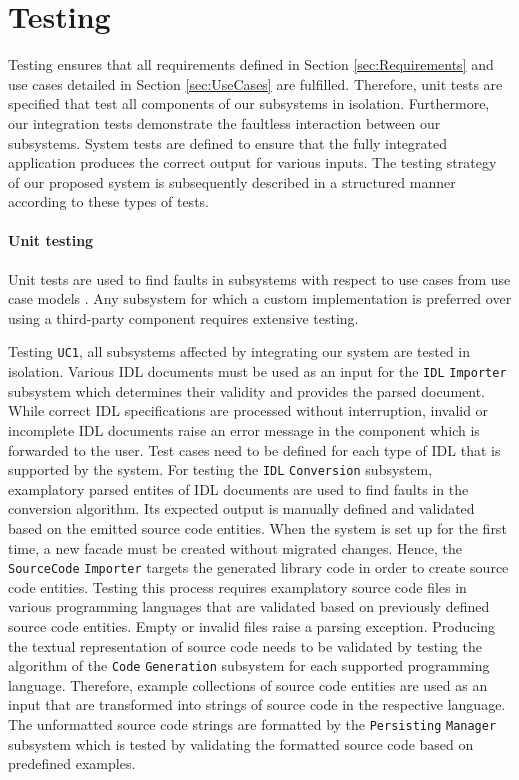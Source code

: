 \section{Testing}
\label{sec:Testing}

Testing ensures that all requirements defined in Section \ref{sec:Requirements} and use cases detailed in Section \ref{sec:UseCases} are fulfilled. Therefore, unit tests are specified that test all components of our subsystems in isolation. Furthermore, our integration tests demonstrate the faultless interaction between our subsystems. System tests are defined to ensure that the fully integrated application produces the correct output for various inputs. The testing strategy of our proposed system is subsequently described in a structured manner according to these types of tests.

\paragraph{Unit testing} Unit tests are used to find faults in subsystems with respect to use cases from use case models \cite{bruegge_object-oriented_2010}. Any subsystem for which a custom implementation is preferred over using a third-party component requires extensive testing.

Testing \texttt{UC1}, all subsystems affected by integrating our system are tested in isolation. Various IDL documents must be used as an input for the \texttt{IDL} \texttt{Importer} subsystem which determines their validity and provides the parsed document. While correct IDL specifications are processed without interruption, invalid or incomplete IDL documents raise an error message in the component which is forwarded to the user. Test cases need to be defined for each type of IDL that is supported by the system. For testing the \texttt{IDL} \texttt{Conversion} subsystem, examplatory parsed entites of IDL documents are used to find faults in the conversion algorithm. Its expected output is manually defined and validated based on the emitted source code entities. When the system is set up for the first time, a new facade must be created without migrated changes. Hence, the \texttt{Source\-Code} \texttt{Importer} targets the generated library code in order to create source code entities. Testing this process requires examplatory source code files in various programming languages that are validated based on previously defined source code entities. Empty or invalid files raise a parsing exception. Producing the textual representation of source code needs to be validated by testing the algorithm of the \texttt{Code} \texttt{Generation} subsystem for each supported programming language. Therefore, example collections of source code entities are used as an input that are transformed into strings of source code in the respective language. The unformatted source code strings are formatted by the \texttt{Persisting} \texttt{Manager} subsystem which is tested by validating the formatted source code based on predefined examples. 

